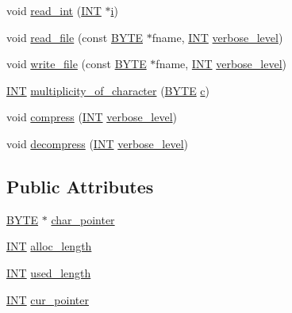 \begin{DoxyCompactItemize}
\item 
void \mbox{\hyperlink{classmemory__object_a6aaa53a5e94345b5a0343a07d32f20b4}{read\+\_\+int}} (\mbox{\hyperlink{galois_8h_a09fddde158a3a20bd2dcadb609de11dc}{I\+NT}} $\ast$\mbox{\hyperlink{alphabet2_8_c_acb559820d9ca11295b4500f179ef6392}{i}})
\item 
void \mbox{\hyperlink{classmemory__object_a19850b4ae2c5a995daec451a9725ebf1}{read\+\_\+file}} (const \mbox{\hyperlink{galois_8h_ab6cc7b4aeb6ea31aba2b3fbfc83ff5e6}{B\+Y\+TE}} $\ast$fname, \mbox{\hyperlink{galois_8h_a09fddde158a3a20bd2dcadb609de11dc}{I\+NT}} \mbox{\hyperlink{simeon_8_c_a818073fbcc2f439e7c56952f67386122}{verbose\+\_\+level}})
\item 
void \mbox{\hyperlink{classmemory__object_ad6bc02ec81a0088a4291ba8edf20b262}{write\+\_\+file}} (const \mbox{\hyperlink{galois_8h_ab6cc7b4aeb6ea31aba2b3fbfc83ff5e6}{B\+Y\+TE}} $\ast$fname, \mbox{\hyperlink{galois_8h_a09fddde158a3a20bd2dcadb609de11dc}{I\+NT}} \mbox{\hyperlink{simeon_8_c_a818073fbcc2f439e7c56952f67386122}{verbose\+\_\+level}})
\item 
\mbox{\hyperlink{galois_8h_a09fddde158a3a20bd2dcadb609de11dc}{I\+NT}} \mbox{\hyperlink{classmemory__object_ae756f2f73b88d0150deb1d2b32b5d7a5}{multiplicity\+\_\+of\+\_\+character}} (\mbox{\hyperlink{galois_8h_ab6cc7b4aeb6ea31aba2b3fbfc83ff5e6}{B\+Y\+TE}} \mbox{\hyperlink{alphabet2_8_c_a4e1e0e72dd773439e333c84dd762a9c3}{c}})
\item 
void \mbox{\hyperlink{classmemory__object_a19117ffce9e562d369adac83a51fc997}{compress}} (\mbox{\hyperlink{galois_8h_a09fddde158a3a20bd2dcadb609de11dc}{I\+NT}} \mbox{\hyperlink{simeon_8_c_a818073fbcc2f439e7c56952f67386122}{verbose\+\_\+level}})
\item 
void \mbox{\hyperlink{classmemory__object_af32137ad9fb4961041d6f83c67c5dea2}{decompress}} (\mbox{\hyperlink{galois_8h_a09fddde158a3a20bd2dcadb609de11dc}{I\+NT}} \mbox{\hyperlink{simeon_8_c_a818073fbcc2f439e7c56952f67386122}{verbose\+\_\+level}})
\end{DoxyCompactItemize}
\subsection*{Public Attributes}
\begin{DoxyCompactItemize}
\item 
\mbox{\hyperlink{galois_8h_ab6cc7b4aeb6ea31aba2b3fbfc83ff5e6}{B\+Y\+TE}} $\ast$ \mbox{\hyperlink{classmemory__object_a2ed98d96dff407dcea840fe10da49dd4}{char\+\_\+pointer}}
\item 
\mbox{\hyperlink{galois_8h_a09fddde158a3a20bd2dcadb609de11dc}{I\+NT}} \mbox{\hyperlink{classmemory__object_abb0f5d1d8a7ea132aad50c5359e89833}{alloc\+\_\+length}}
\item 
\mbox{\hyperlink{galois_8h_a09fddde158a3a20bd2dcadb609de11dc}{I\+NT}} \mbox{\hyperlink{classmemory__object_a7deeb1452089f3a16dfb9da259f3e4ae}{used\+\_\+length}}
\item 
\mbox{\hyperlink{galois_8h_a09fddde158a3a20bd2dcadb609de11dc}{I\+NT}} \mbox{\hyperlink{classmemory__object_a52ad3daf2b67e1fdfb413f9ffe38fbb7}{cur\+\_\+pointer}}
\end{DoxyCompactItemize}


